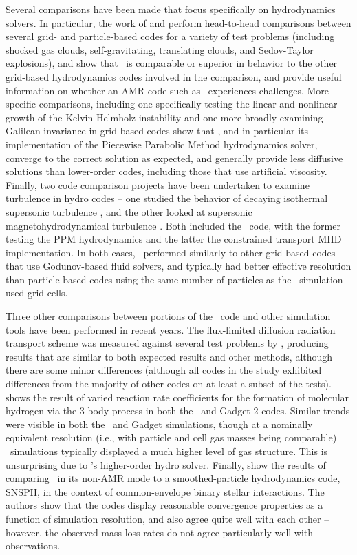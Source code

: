 Several comparisons have been made that focus specifically on
hydrodynamics solvers.  In particular, the work of
\citet{2007MNRAS.380..963A} and \citet{Tasker2008} perform
head-to-head comparisons between several grid- and particle-based
codes for a variety of test problems (including shocked gas clouds,
self-gravitating, translating clouds, and Sedov-Taylor explosions),
and show that \enzo\ is comparable or superior in behavior to the
other grid-based hydrodynamics codes involved in the comparison, and
provide useful information on whether an AMR code such as \enzo\
experiences challenges.  More specific comparisons, including one
specifically testing the linear and nonlinear growth of the
Kelvin-Helmholz instability \citep{2012ApJS..201...18M} and one more
broadly examining Galilean invariance in grid-based codes
\citep{2010MNRAS.401.2463R} show that \enzo, and in particular its
implementation of the Piecewise Parabolic Method hydrodynamics solver,
converge to the correct solution as expected, and generally provide
less diffusive solutions than lower-order codes, including those that
use artificial viscosity.  Finally, two code comparison projects have
been undertaken to examine turbulence in hydro codes -- one studied
the behavior of decaying isothermal supersonic turbulence
\citep{2009A&A...508..541K}, and the other looked at supersonic
magnetohydrodynamical turbulence \citep{2011ApJ...737...13K}.  Both
included the \enzo\ code, with the former testing the PPM
hydrodynamics and the latter the constrained transport MHD
implementation.  In both cases, \enzo\ performed similarly to other
grid-based codes that use Godunov-based fluid solvers, and typically
had better effective resolution than particle-based codes using the
same number of particles as the \enzo\ simulation used grid cells.

Three other comparisons between portions of the \enzo\ code and other
simulation tools have been performed in recent years.  The
flux-limited diffusion radiation transport scheme was measured against
several test problems by \citet{IlievEtAl2009}, producing results that
are similar to both expected results and other methods, although there
are some minor differences (although all codes in the study exhibited
differences from the majority of other codes on at least a subset of
the tests).  \citet{2011ApJ...726...55T} shows the result of varied
reaction rate coefficients for the formation of molecular hydrogen via
the 3-body process in both the \enzo\ and Gadget-2 codes.  Similar
trends were visible in both the \enzo\ and Gadget simulations, though
at a nominally equivalent resolution (i.e., with particle and cell gas
masses being comparable) \enzo\ simulations typically displayed a much
higher level of gas structure.  This is unsurprising due to \enzo's
higher-order hydro solver.  Finally, \citet{2012ApJ...744...52P} show
the results of comparing \enzo\ in its non-AMR mode to a
smoothed-particle hydrodynamics code, SNSPH, in the context of
common-envelope binary stellar interactions.  The authors show that
the codes display reasonable convergence properties as a function of
simulation resolution, and also agree quite well with each other --
however, the observed mass-loss rates do not agree particularly well
with observations.

